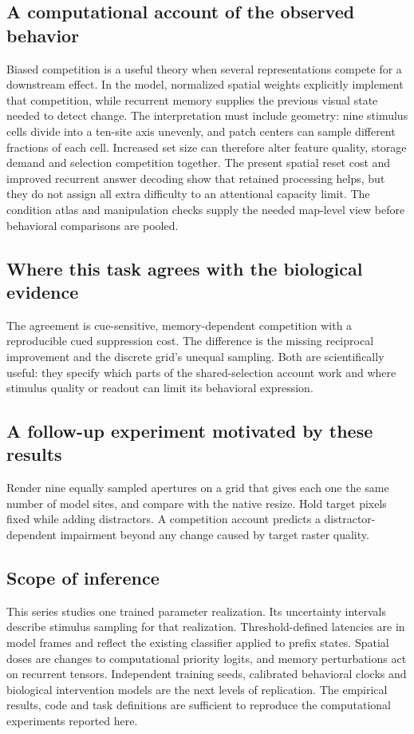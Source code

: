 \documentclass[11pt]{article}
\begin{document}
\subsection{A computational account of the observed behavior}
Biased competition is a useful theory when several representations compete for a downstream effect. In the model, normalized spatial weights explicitly implement that competition, while recurrent memory supplies the previous visual state needed to detect change. The interpretation must include geometry: nine stimulus cells divide into a ten-site axis unevenly, and patch centers can sample different fractions of each cell. Increased set size can therefore alter feature quality, storage demand and selection competition together. The present spatial reset cost and improved recurrent answer decoding show that retained processing helps, but they do not assign all extra difficulty to an attentional capacity limit. The condition atlas and manipulation checks supply the needed map-level view before behavioral comparisons are pooled.

\subsection{Where this task agrees with the biological evidence}
The agreement is cue-sensitive, memory-dependent competition with a reproducible cued suppression cost. The difference is the missing reciprocal improvement and the discrete grid’s unequal sampling. Both are scientifically useful: they specify which parts of the shared-selection account work and where stimulus quality or readout can limit its behavioral expression.

\subsection{A follow-up experiment motivated by these results}
Render nine equally sampled apertures on a grid that gives each one the same number of model sites, and compare with the native resize. Hold target pixels fixed while adding distractors. A competition account predicts a distractor-dependent impairment beyond any change caused by target raster quality.
\subsection{Scope of inference}
This series studies one trained parameter realization. Its uncertainty intervals describe stimulus sampling for that realization. Threshold-defined latencies are in model frames and reflect the existing classifier applied to prefix states. Spatial doses are changes to computational priority logits, and memory perturbations act on recurrent tensors. Independent training seeds, calibrated behavioral clocks and biological intervention models are the next levels of replication. The empirical results, code and task definitions are sufficient to reproduce the computational experiments reported here.
\end{document}

